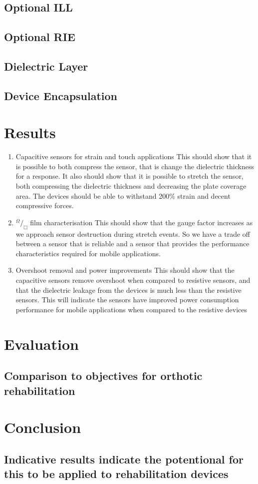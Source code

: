 \documentclass[11pt,twoside,a4paper]{article}
\newcommand*\rfrac[2]{{}^{#1}\!/_{#2}}
\begin{document}
		\subsection{Optional ILL}
		
		\subsection{Optional RIE}
		
		\subsection{Dielectric Layer}
		
		\subsection{Device Encapsulation}
		
	\newpage
	\section{Results}
		\begin{enumerate}
			\item Capacitive sensors for strain and touch applications \newline
				This should show that it is possible to both compress the sensor, that is change the dielectric thickness for a response. It also should show that it is possible to stretch 				the sensor, both compressing the dielectric thickness and decreasing the plate coverage area. The devices should be able to withstand 200\% strain and decent 					compressive forces.
			\item $ \rfrac{\Omega}{\Box} $ film characterisation \newline
				This should show that the gauge factor increases as we approach sensor destruction during stretch events. So we have a trade off between a sensor that is reliable 	
				and a sensor that provides the performance characteristics required for mobile applications.
			\item Overshoot removal and power improvements \newline
				This should show that the capacitive sensors remove overshoot when compared to resistive sensors, and that the dielectric leakage from the devices is much less					than the resistive sensors. This will indicate the sensors have improved power consumption performance for mobile applications when compared to the resistive 						devices
		\end{enumerate}
	\newpage
	\section{Evaluation}
		\subsection{Comparison to objectives for orthotic rehabilitation}
	\newpage
	\section{Conclusion}
		\subsection{Indicative results indicate the potentional for this to be applied to rehabilitation devices}
\end{document}
